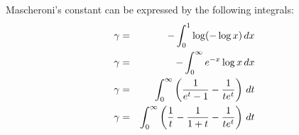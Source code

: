 \documentclass[12pt]{article}
\begin{document}
Mascheroni's constant can be expressed by the following integrals:
\begin{eqnarray*}
\gamma &=& - \int_0^1 \log (- \log x) \, dx \\
\gamma &=& - \int_0^\infty e^{-x} \log x \, dx \\
\gamma &=& \int_0^\infty \left( {1 \over e^t - 1} - {1 \over t e^t} \right) \, dt \\
\gamma &=& \int_0^\infty \left( {1 \over t} - {1 \over 1 + t} - {1 \over t e^t} \right) \, dt \\
\end{eqnarray*}

\end{document}

